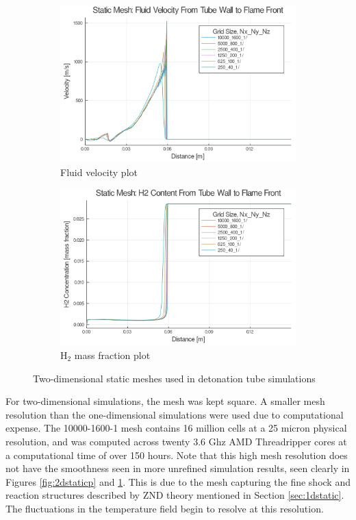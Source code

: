 \begin{figure} \ContinuedFloat
    
    \begin{subfigure}[]{0.95\textwidth}
        \centering
        \includegraphics[width=\textwidth]{./figs/static2d/u.png}
        \caption{Fluid velocity plot}
        \label{fig:2dstaticu}
    \end{subfigure}

    \begin{subfigure}[]{0.95\textwidth}
        \centering
        \includegraphics[width=\textwidth]{./figs/static2d/y.png}
        \caption{H\(_2\) mass fraction plot}
    \end{subfigure}

    \caption{Two-dimensional static meshes used in detonation tube simulations}
    \label{fig:2dstatic}
\end{figure}%
For two-dimensional simulations, the mesh was kept square. A smaller mesh resolution than the one-dimensional simulations were used due to computational expense. The 10000-1600-1 mesh contains 16 million cells at a 25 micron physical resolution, and was computed across twenty 3.6 Ghz AMD Threadripper cores at a computational time of over 150 hours. Note that this high mesh resolution does not have the smoothness seen in more unrefined simulation results, seen clearly in Figures \ref{fig:2dstaticp} and \ref{fig:2dstaticu}. This is due to the mesh capturing the fine shock and reaction structures described by ZND theory mentioned in Section \ref{sec:1dstatic}. The fluctuations in the temperature field begin to resolve at this resolution. 

